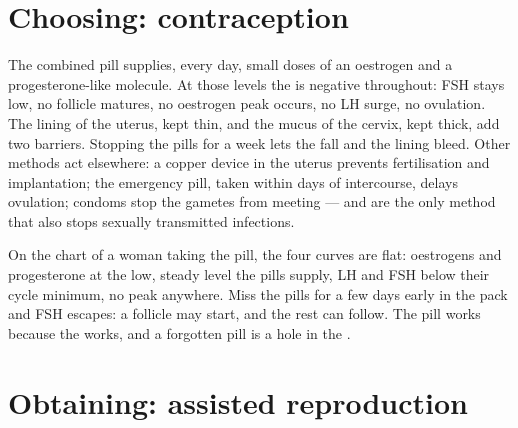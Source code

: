 \section{Choosing: contraception}

\begin{proposition}\label{prop:g11:hormones-and-reproduction:contraception}
The combined pill supplies, every day, small doses of an oestrogen
and a progesterone-like molecule. At those levels the  is
negative throughout: FSH stays low, no follicle matures, no oestrogen
peak occurs, no LH surge, no ovulation. The lining of the uterus,
kept thin, and the mucus of the cervix, kept thick, add two barriers.
Stopping the pills for a week lets the  fall and the lining
bleed. Other methods act elsewhere: a copper device in the uterus
prevents fertilisation and implantation; the emergency pill, taken
within days of intercourse, delays ovulation; condoms stop the
gametes from meeting --- and are the only method that also stops
sexually transmitted infections.
\end{proposition}
\admitted

\begin{example}\label{ex:g11:hormones-and-reproduction:pill}
On the chart of a woman taking the pill, the four curves are flat:
oestrogens and progesterone at the low, steady level the pills
supply, LH and FSH below their cycle minimum, no peak anywhere.
Miss the pills for a few days early in the pack and FSH escapes: a
follicle may start, and the rest can follow. The pill works because
the  works, and a forgotten pill is a hole in the .
\end{example}

\section{Obtaining: assisted reproduction}

